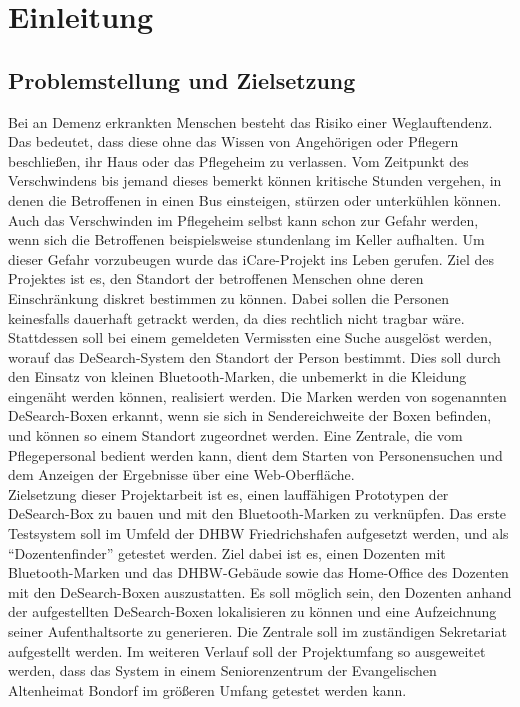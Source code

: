 
\section{Einleitung}


\subsection{Problemstellung und Zielsetzung}
Bei an Demenz erkrankten Menschen besteht das Risiko einer Weglauftendenz. Das bedeutet, dass diese ohne das Wissen von Angehörigen oder Pflegern beschließen, ihr Haus oder das Pflegeheim zu verlassen. Vom Zeitpunkt des Verschwindens bis jemand dieses bemerkt können kritische Stunden vergehen, in denen die Betroffenen in einen Bus einsteigen, stürzen oder unterkühlen können. Auch das Verschwinden im Pflegeheim selbst kann schon zur Gefahr werden, wenn sich die Betroffenen beispielsweise stundenlang im Keller aufhalten. Um dieser Gefahr vorzubeugen wurde das iCare-Projekt ins Leben gerufen. Ziel des Projektes ist es, den Standort der betroffenen Menschen ohne deren Einschränkung diskret bestimmen zu können. Dabei sollen die Personen keinesfalls dauerhaft getrackt werden, da dies rechtlich nicht tragbar wäre. Stattdessen soll bei einem gemeldeten Vermissten eine Suche ausgelöst werden, worauf das DeSearch-System den Standort der Person bestimmt. Dies soll durch den Einsatz von kleinen Bluetooth-Marken, die unbemerkt in die Kleidung eingenäht werden können, realisiert werden. Die Marken werden von sogenannten DeSearch-Boxen erkannt, wenn sie sich in Sendereichweite der Boxen befinden, und können so einem Standort zugeordnet werden. Eine Zentrale, die vom Pflegepersonal bedient werden kann, dient dem Starten von Personensuchen und dem Anzeigen der Ergebnisse über eine Web-Oberfläche.
\\Zielsetzung dieser Projektarbeit ist es, einen lauffähigen Prototypen der DeSearch-Box zu bauen und mit den Bluetooth-Marken zu verknüpfen. Das erste Testsystem soll im Umfeld der DHBW Friedrichshafen aufgesetzt werden, und als “Dozentenfinder” getestet werden. Ziel dabei ist es, einen Dozenten mit Bluetooth-Marken und das DHBW-Gebäude sowie das Home-Office des Dozenten mit den DeSearch-Boxen auszustatten. Es soll möglich sein, den Dozenten anhand der aufgestellten DeSearch-Boxen lokalisieren zu können und eine Aufzeichnung seiner Aufenthaltsorte zu generieren. Die Zentrale soll im zuständigen Sekretariat aufgestellt werden.
Im weiteren Verlauf soll der Projektumfang so ausgeweitet werden, dass das System in einem Seniorenzentrum der Evangelischen Altenheimat Bondorf im größeren Umfang getestet werden kann.




